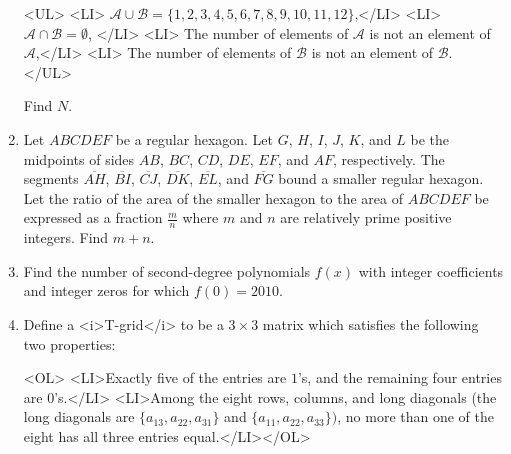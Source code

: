 \documentclass{article}
\begin{document}
\begin{enumerate}[label=\arabic*., itemsep=0.5em]
<UL>
<LI> $\mathcal{A} \cup \mathcal{B} = \{1,2,3,4,5,6,7,8,9,10,11,12\}$,</LI>
<LI> $\mathcal{A} \cap \mathcal{B} = \emptyset$, </LI>
<LI> The number of elements of $\mathcal{A}$ is not an element of $\mathcal{A}$,</LI>
<LI> The number of elements of $\mathcal{B}$ is not an element of $\mathcal{B}$.
</UL>

Find $N$.\par \vspace{0.5em}\item Let $ABCDEF$ be a regular hexagon. Let $G$, $H$, $I$, $J$, $K$, and $L$ be the midpoints of sides $AB$, $BC$, $CD$, $DE$, $EF$, and $AF$, respectively. The segments $\overline{AH}$, $\overline{BI}$, $\overline{CJ}$, $\overline{DK}$, $\overline{EL}$, and $\overline{FG}$ bound a smaller regular hexagon. Let the ratio of the area of the smaller hexagon to the area of $ABCDEF$ be expressed as a fraction $\frac {m}{n}$ where $m$ and $n$ are relatively prime positive integers. Find $m + n$.\par \vspace{0.5em}\item Find the number of second-degree polynomials $f(x)$ with integer coefficients and integer zeros for which $f(0)=2010$.\par \vspace{0.5em}\item Define a <i>T-grid</i> to be a $3\times3$ matrix which satisfies the following two properties:

<OL>
<LI>Exactly five of the entries are $1$'s, and the remaining four entries are $0$'s.</LI>
<LI>Among the eight rows, columns, and long diagonals (the long diagonals are $\{a_{13},a_{22},a_{31}\}$ and $\{a_{11},a_{22},a_{33}\})$, no more than one of the eight has all three entries equal.</LI></OL>


\end{enumerate}
\end{document}
